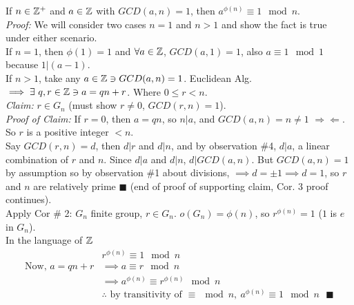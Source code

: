 \setcounter{dummy_lemma}{0}
\begin{corollary}
If $n\in {\mathbb{ Z}}^+$ and $a\in {\mathbb{ Z}}$ with $GCD(a,n)=1$, then $a^{\phi(n)}\equiv 1 \mod n$. \steezybreak\\
\textit{Proof:} We will consider two cases $n=1$ and $n>1$ and show the fact is true under either scenario. \steezybreak\\
If $n=1$, then $\phi(1)=1$ and $\forall a \in {\mathbb{ Z}}$, $GCD(a,1)=1$, also $a\equiv 1 \mod 1$ because $1|(a-1)$.\steezybreak\\
If $n>1$, take any $a\in {\mathbb{ Z}} \ni GCD(a,n)=1$. Euclidean Alg. $\implies \exists \ q,r \in {\mathbb{ Z}} \ni a=qn+r$. Where $0\leq r < n$.\steezybreak\\
\textit{Claim:} $r\in G_n$ (must show $r\neq 0$, $GCD(r,n)=1$). \\
\textit{Proof of Claim: }If $r=0$, then $a=qn$, so $n|a$, and $GCD(a,n)=n\neq 1$ $\Rightarrow\Leftarrow$. So $r$ is a positive integer $<  n$. \steezybreak\\
Say $GCD(r,n)=d$, then $d|r$ and $d|n$, and by observation \#4, $d|a$, a linear combination of $r$ and $n$. Since $d|a$ and $d|n$, $d|GCD(a,n)$. But $GCD(a,n)=1$ by assumption so by observation \#1 about divisions, $\implies d= \pm 1 \implies d= 1$, so $r$ and $n$ are relatively prime $\blacksquare$ (end of proof of supporting claim, Cor. 3 proof continues).\steezybreak\\
Apply Cor \# 2: $G_n$ finite group, $r\in G_n$. $o(G_n)=\phi(n)$, so $r^{\phi(n)}=1$ ($1$ is $e$ in $G_n$).\\
In the language of ${\mathbb{ Z}}$
\begin{align}
    &r^{\phi(n)}\equiv 1 \mod n\nonumber \\
    \text{Now, } a=qn+r &\implies a\equiv r \mod n \nonumber \\
    &\implies a^{\phi(n)} \equiv r^{\phi(n)}\mod n \nonumber \\
    &\therefore \text{ by transitivity of }\equiv \mod n, \ a^{\phi(n)}\equiv 1 \mod n \ \ \ \blacksquare \nonumber 
\end{align}
\end{corollary}

